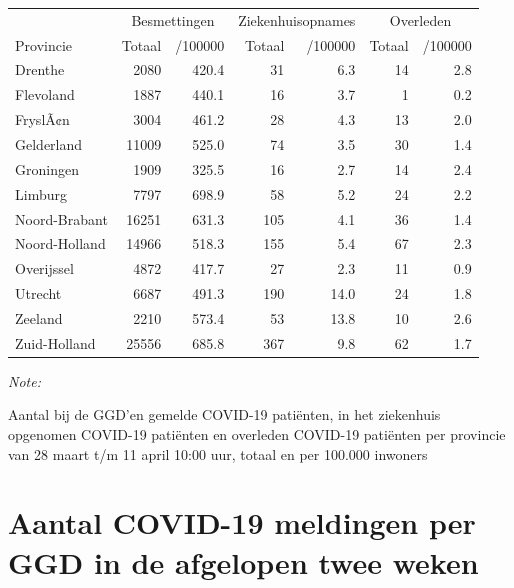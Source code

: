 \documentclass[
  english,
  man,floatsintext]{apa6}
\begin{document}
\begin{table}
\centering
\begin{threeparttable}
\begin{tabular}{lrrrrrr}
\toprule
\multicolumn{1}{c}{ } & \multicolumn{2}{c}{Besmettingen} & \multicolumn{2}{c}{Ziekenhuisopnames} & \multicolumn{2}{c}{Overleden} \\
\cmidrule(l{3pt}r{3pt}){2-3} \cmidrule(l{3pt}r{3pt}){4-5} \cmidrule(l{3pt}r{3pt}){6-7}
Provincie & Totaal & /100000 & Totaal & /100000 & Totaal & /100000\\
\midrule
Drenthe & 2080 & 420.4 & 31 & 6.3 & 14 & 2.8\\
Flevoland & 1887 & 440.1 & 16 & 3.7 & 1 & 0.2\\
FryslÃ¢n & 3004 & 461.2 & 28 & 4.3 & 13 & 2.0\\
Gelderland & 11009 & 525.0 & 74 & 3.5 & 30 & 1.4\\
Groningen & 1909 & 325.5 & 16 & 2.7 & 14 & 2.4\\
Limburg & 7797 & 698.9 & 58 & 5.2 & 24 & 2.2\\
Noord-Brabant & 16251 & 631.3 & 105 & 4.1 & 36 & 1.4\\
Noord-Holland & 14966 & 518.3 & 155 & 5.4 & 67 & 2.3\\
Overijssel & 4872 & 417.7 & 27 & 2.3 & 11 & 0.9\\
Utrecht & 6687 & 491.3 & 190 & 14.0 & 24 & 1.8\\
Zeeland & 2210 & 573.4 & 53 & 13.8 & 10 & 2.6\\
Zuid-Holland & 25556 & 685.8 & 367 & 9.8 & 62 & 1.7\\
\bottomrule
\end{tabular}
\begin{tablenotes}
\item \textit{Note: } 
\item Aantal bij de GGD’en gemelde COVID-19 patiënten, in het ziekenhuis opgenomen COVID-19 patiënten en overleden COVID-19 patiënten per provincie van 28 maart t/m 11 april 10:00 uur, totaal en per 100.000 inwoners
\end{tablenotes}
\end{threeparttable}
\end{table}

\newpage

\hypertarget{aantal-covid-19-meldingen-per-ggd-in-de-afgelopen-twee-weken}{%
\section{Aantal COVID-19 meldingen per GGD in de afgelopen twee weken}\label{aantal-covid-19-meldingen-per-ggd-in-de-afgelopen-twee-weken}}
\end{document}
